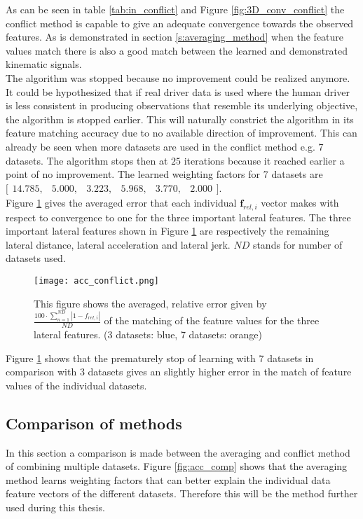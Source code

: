 As can be seen in table \ref{tab:in_conflict} and Figure \ref{fig:3D_conv_conflict} the conflict method is capable to give an adequate convergence towards the observed features. As is demonstrated in section \ref{s:averaging_method} when the feature values match there is also a good match between the learned and demonstrated kinematic signals.\\

The algorithm was stopped because no improvement could be realized anymore. It could be hypothesized that if real driver data is used where the human driver is less consistent in producing observations that resemble its underlying objective, the algorithm is stopped earlier. This will naturally constrict the algorithm in its feature matching accuracy due to no available direction of improvement. This can already be seen when more datasets are used in the conflict method e.g. 7 datasets. The algorithm stops then at $25$ iterations because it reached earlier a point of no improvement. The learned weighting factors for 7 datasets are $\bigl[ \begin{smallmatrix} 14.785,&5.000,&3.223,&5.968,&3.770,&2.000\end{smallmatrix}\bigr]$. \\
Figure \ref{fig:acc_conflict} gives the averaged error that each individual $\bm{f}_{rel,i}$ vector makes with respect to convergence to one for the three important lateral features. The three important lateral features shown in Figure \ref{fig:acc_conflict} are respectively the remaining lateral distance, lateral acceleration and lateral jerk. $ND$ stands for number of datasets used.

\begin{figure}[h!]
	\centering
	\texttt{[image: acc\_conflict.png]}
	\caption{This figure shows the averaged, relative error given by $\frac{100\cdot\sum_{n=1}^{ND}|1-f_{rel,i}|}{ND}$ of the matching of the feature values for the three lateral features. (3 datasets: blue, 7 datasets: orange)}
	\label{fig:acc_conflict}
\end{figure}

Figure \ref{fig:acc_conflict} shows that the prematurely stop of learning with 7 datasets in comparison with 3 datasets gives an slightly higher error in the match of feature values of the individual datasets.    
 
\subsection{Comparison of methods}\label{s:comparison of methods}
In this section a comparison is made between the averaging and conflict method of combining multiple datasets. Figure \ref{fig:acc_comp} shows that the averaging method learns weighting factors that can better explain the individual data feature vectors of the different datasets. Therefore this will be the method further used during this thesis.

